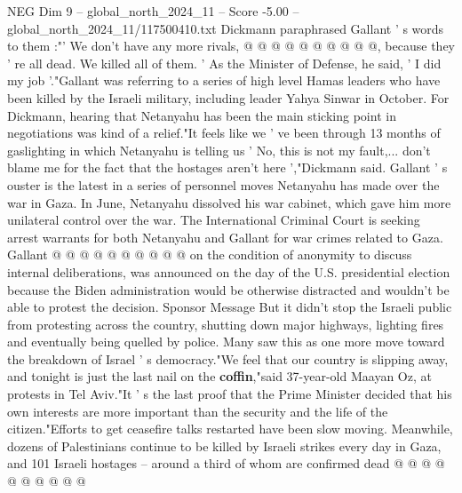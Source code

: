 \begin{textsample}{NEG Dim 9 – global\_north\_2024\_11 – Score -5.00 – global\_north\_2024\_11/117500410.txt}
Dickmann paraphrased Gallant ' s words to them :"' We don't have any more rivals, @ @ @ @ @ @ @ @ @ @, because they ' re all dead.
We killed all of them. ' As the Minister of Defense, he said, ' I did my job '."Gallant was referring to a series of high level Hamas leaders who have been killed by the Israeli military, including leader Yahya Sinwar in October.
For Dickmann, hearing that Netanyahu has been the main sticking point in negotiations was kind of a relief."It feels like we ' ve been through 13 months of gaslighting in which Netanyahu is telling us ' No, this is not my fault,... don't blame me for the fact that the hostages aren't here ',"Dickmann said.
Gallant ' s ouster is the latest in a series of personnel moves Netanyahu has made over the war in Gaza.
In June, Netanyahu dissolved his war cabinet, which gave him more unilateral control over the war.
The International Criminal Court is seeking arrest warrants for both Netanyahu and Gallant for war crimes related to Gaza.
Gallant @ @ @ @ @ @ @ @ @ @ on the condition of anonymity to discuss internal deliberations, was announced on the day of the U.S. presidential election because the Biden administration would be otherwise distracted and wouldn't be able to protest the decision.
Sponsor Message But it didn't stop the Israeli public from protesting across the country, shutting down major highways, lighting fires and eventually being quelled by police.
Many saw this as one more move toward the breakdown of Israel ' s democracy."We feel that our country is slipping away, and tonight is just the last nail on the \textbf{coffin},"said 37-year-old Maayan Oz, at protests in Tel Aviv."It ' s the last proof that the Prime Minister decided that his own interests are more important than the security and the life of the citizen."Efforts to get ceasefire talks restarted have been slow moving.
Meanwhile, dozens of Palestinians continue to be killed by Israeli strikes every day in Gaza, and 101 Israeli hostages -- around a third of whom are confirmed dead @ @ @ @ @ @ @ @ @ @

\end{textsample}
